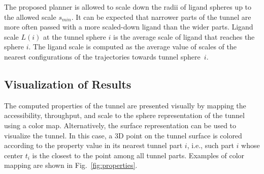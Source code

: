 \documentclass{svmult}
\def\R{\mathbb{R}}
\def\smin{s_{min}}
\begin{document}

The proposed planner is allowed to scale down the radii of ligand spheres up to the allowed scale $\smin$. 
It can be expected that narrower parts of the tunnel are more often passed with a more scaled-down ligand than
the wider parts.
Ligand scale $L(i)$ at the tunnel sphere $i$ is the average scale of ligand that reaches the sphere $i$.
The ligand scale is computed as the average value of scales of the nearest configurations of the trajectories towards tunnel sphere~$i$.



\subsection{Visualization of Results}

The computed properties of the tunnel are presented visually by mapping the accessibility, throughput, and scale to the sphere representation
of the tunnel using a color map.
Alternatively, the surface representation can be used to visualize the tunnel.
In this case, a 3D point on the tunnel surface is colored according to the property value in its nearest tunnel part $i$,  i.e., such part $i$ whose center $t_i$ is the closest to the point among all tunnel parts.
Examples of color mapping are shown in Fig.~\ref{fig:properties}.
\end{document}

